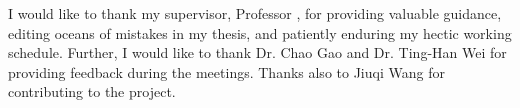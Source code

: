 \begin{acknowledgements}
    I would like to thank my supervisor, Professor \supname, for providing valuable guidance, editing oceans of mistakes in my thesis, and patiently enduring my hectic working schedule.
    Further, I would like to thank Dr. Chao Gao and Dr. Ting-Han Wei for providing feedback during the meetings.
    Thanks also to Jiuqi Wang for contributing to the project.
\end{acknowledgements}